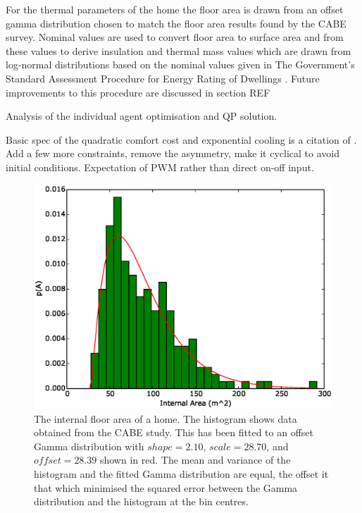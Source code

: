 \documentclass[a4paper, 10 pt, conference]{ieeeconf}  %
\begin{document}
For the thermal parameters of the home the floor area is drawn from an offset gamma distribution chosen to match the floor area results found by the CABE survey. Nominal values are used to convert floor area to surface area and from these values to derive insulation and thermal mass values which are drawn from log-normal distributions based on the nominal values given in The Government’s Standard Assessment Procedure for Energy Rating of Dwellings \cite{SAP}. Future improvements to this procedure are discussed in section REF

Analysis of the individual agent optimisation and QP solution.



Basic spec of the quadratic comfort cost and exponential cooling is a citation of \cite{ramchurn2011agent}. Add a few more constraints, remove the asymmetry, make it cyclical to avoid initial conditions. Expectation of PWM rather than direct on-off input.


\begin{figure}[htb]
\centering
\includegraphics[width=\columnwidth,trim =0cm 0cm 0cm 0cm,clip=True]{f3.eps}
\caption{The internal floor area of a home. The histogram shows data obtained from the CABE study. This has been fitted to an offset Gamma distribution with $shape=2.10$, $scale=28.70$, and $ offset=28.39$ shown in red. The mean and variance of the histogram and the fitted Gamma distribution are equal, the offset it that which minimised the squared error between the Gamma distribution and the histogram at the bin centres.}
\label{GIA}
\end{figure}
\end{document}
